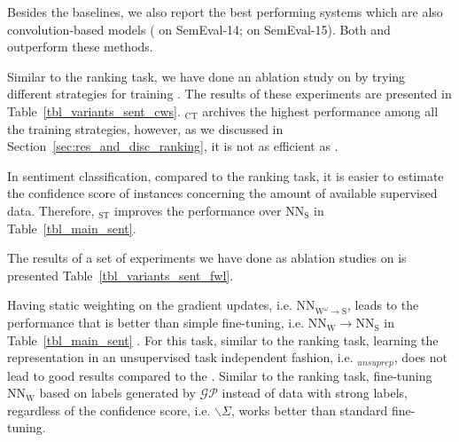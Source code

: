 Besides the baselines, we also report the best performing systems which are also convolution-based models (\citealt{Rouvier:2016} on SemEval-14; \citealt{Deriu2016:SemEval} on SemEval-15). Both \cws and \fwl outperform these methods.



Similar to the ranking task, we have done an ablation study on \cws by trying different strategies for training \cws. The results of these experiments are presented in Table~\ref{tbl_variants_sent_cws}. \cws$_\text{CT}$ archives the highest performance among all the training strategies, however, as we discussed in Section~\ref{sec:res_and_disc_ranking}, it is not as efficient as \cws. 

In sentiment classification, compared to the ranking task, it is easier to estimate the confidence score of instances concerning the amount of available supervised data. Therefore, \cws$_\text{ST}$ improves the performance over $\text{NN}_{\text{S}}$ in Table~\ref{tbl_main_sent}. 



The results of a set of experiments we have done as ablation studies on \fwl is presented Table~\ref{tbl_variants_sent_fwl}. 

Having static weighting on the gradient updates, i.e. NN$_{\text{W}^\omega \to \text{S}}$, leads to the performance that is better than simple fine-tuning, i.e. $\text{NN}_{\text{W}} \to \text{NN}_{\text{S}}$ in Table~\ref{tbl_main_sent} .
%
For this task, similar to the ranking task, learning the representation in an unsupervised task independent fashion, i.e. \fwlnospace$_{unsuprep}$, does not lead to good results compared to the \fwl.
%
Similar to the ranking task, fine-tuning $\text{NN}_{\text{W}}$ based on labels generated by $\mathcal{GP}$ instead of data with strong labels, regardless of the confidence score, i.e. \fwl$\backslash\Sigma$, works better than standard fine-tuning. 
